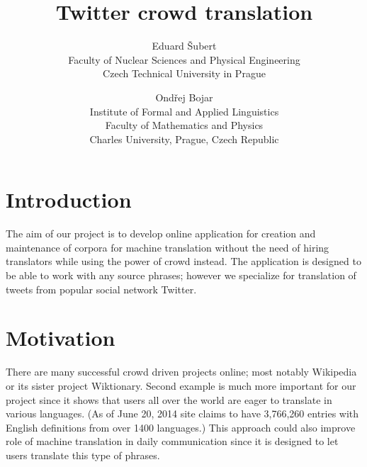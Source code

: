 \setlength{\topmargin}{-.5in}
\setlength{\textheight}{9in}
\setlength{\oddsidemargin}{.125in}
\setlength{\textwidth}{6.25in}

\title{\textbf{Twitter crowd translation}}
\author{
Eduard \v{S}ubert\\
Faculty of Nuclear Sciences and Physical Engineering\\
Czech Technical University in Prague
\and
Ond\v{r}ej Bojar\\
Institute of Formal and Applied Linguistics\\
Faculty of Mathematics and Physics\\
Charles University, Prague, Czech Republic
}

\renewcommand{\today}{June 20, 2014}
\maketitle

\def\footurl#1{\footnote{\tt{} #1}}
\def\equo#1{``#1''}

\def\hashtag#1{\texttt{\##1}}

\maketitle
%
\section{Introduction}
The aim of our project is to develop online application for creation and maintenance of corpora for machine translation without the need of hiring translators while using the power of crowd instead. The application is designed to be able to work with any source phrases; however we specialize for translation of tweets from popular social network Twitter.

%
\section{Motivation}
There are many successful crowd driven projects online; most notably Wikipedia or its sister project Wiktionary. Second example is much more important for our project since it shows that users all over the world are eager to translate in various languages. (As of \today{ }site claims to have 3,766,260 entries with English definitions from over 1400 languages.) This approach could also improve role of machine translation in daily communication since it is designed to let users translate this type of phrases.
%
